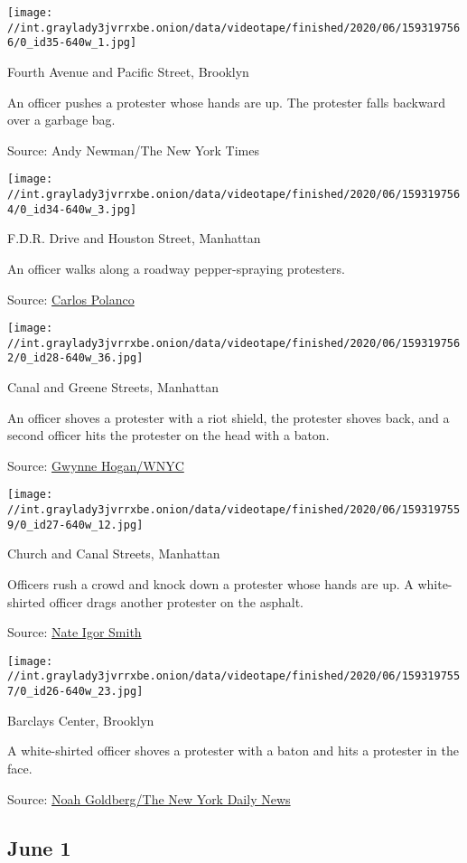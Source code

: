 \texttt{[image: //int.graylady3jvrrxbe.onion/data/videotape/finished/2020/06/1593197566/0\_id35-640w\_1.jpg]}

 Fourth Avenue and Pacific Street, Brooklyn

 An officer pushes a protester whose hands are up. The protester falls
backward over a garbage bag.

Source: Andy Newman/The New York Times

\texttt{[image: //int.graylady3jvrrxbe.onion/data/videotape/finished/2020/06/1593197564/0\_id34-640w\_3.jpg]}

 F.D.R. Drive and Houston Street, Manhattan

 An officer walks along a roadway pepper-spraying protesters.

Source:
\href{https://twitter.com/CPolanco18/status/1267129751975706624}{Carlos
Polanco}

\texttt{[image: //int.graylady3jvrrxbe.onion/data/videotape/finished/2020/06/1593197562/0\_id28-640w\_36.jpg]}

 Canal and Greene Streets, Manhattan

 An officer shoves a protester with a riot shield, the protester shoves
back, and a second officer hits the protester on the head with a baton.

Source:
\href{https://twitter.com/GwynneFitz/status/1267267195870097413}{Gwynne
Hogan/WNYC}

\texttt{[image: //int.graylady3jvrrxbe.onion/data/videotape/finished/2020/06/1593197559/0\_id27-640w\_12.jpg]}

 Church and Canal Streets, Manhattan

 Officers rush a crowd and knock down a protester whose hands are up. A
white-shirted officer drags another protester on the asphalt.

Source:
\href{https://twitter.com/drivenbyboredom/status/1267263490009546753}{Nate
Igor Smith}

\texttt{[image: //int.graylady3jvrrxbe.onion/data/videotape/finished/2020/06/1593197557/0\_id26-640w\_23.jpg]}

 Barclays Center, Brooklyn

 A white-shirted officer shoves a protester with a baton and hits a
protester in the face.

Source:
\href{https://twitter.com/Noah__Goldberg/status/1267285022031130625}{Noah
Goldberg/The New York Daily News}

\hypertarget{june-1}{%
\subsection{June 1}\label{june-1}}

